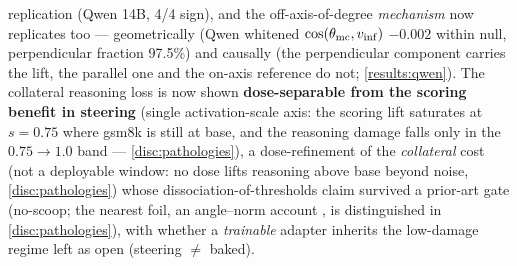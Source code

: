 replication (Qwen 14B, 4/4 sign), and the off-axis-of-degree \emph{mechanism} now
replicates too --- geometrically (Qwen whitened $\cos(\theta_{\mathrm{mc}}, v_{\mathrm{inf}})$ $-0.002$
within null, perpendicular fraction 97.5\%) and causally (the perpendicular component
carries the lift, the parallel one and the on-axis reference do not;
\cref{results:qwen}). The collateral reasoning loss is now shown
\textbf{dose-separable from the scoring benefit in steering} (single
activation-scale axis: the scoring lift saturates at $s{=}0.75$ where gsm8k is
still at base, and the reasoning damage falls only in the $0.75{\rightarrow}1.0$
band --- \cref{disc:pathologies}), a dose-refinement of the \emph{collateral} cost
(not a deployable window: no dose lifts reasoning above base beyond noise,
\cref{disc:pathologies}) whose dissociation-of-thresholds claim survived a
prior-art gate (no-scoop; the nearest foil, an angle--norm account
\citep{AngleNorm}, is distinguished in \cref{disc:pathologies}), with whether a
\emph{trainable} adapter inherits the low-damage regime left as open (steering
${\neq}$ baked).
